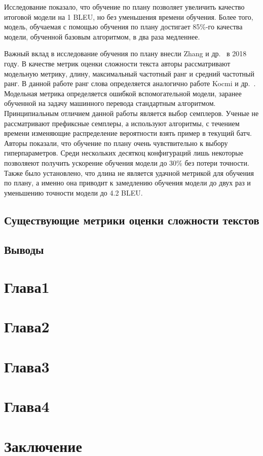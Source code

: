 \documentclass{spbau-diploma}
\begin{document}
Исследование показало, что обучение по плану позволяет увеличить качество итоговой модели на 1 BLEU, но без уменьшения времени обучения. Более того, модель, обучаемая с помощью обучения по плану достигает 85\%-го качества модели, обученной базовым алгоритмом, в два раза медленнее.

Важный вклад в исследование обучения по плану внесли Zhang и др.~\cite{zhang2018empirical} в 2018 году. В качестве метрик оценки сложности текста авторы рассматривают модельную метрику, длину, максимальный частотный ранг и средний частотный ранг. В данной работе ранг слова определяется аналогично работе Kocmi и др.~\cite{kocmi2017curriculum}. Модельная метрика определяется ошибкой вспомогательной модели, заранее обученной на задачу машинного перевода стандартным алгоритмом. Принципиальным отличием данной работы является выбор семплеров. Ученые не рассматривают префиксные семплеры, а используют алгоритмы, с течением времени изменяющие распределение вероятности взять пример в текущий батч. Авторы показали, что обучение по плану очень чувствительно к выбору гиперпараметров. Среди нескольких десяткоц конфигураций лишь некоторые позволяеют получить ускорение обучения модели до 30\% без потери точности. Также было установлено, что длина не является удачной метрикой для обучения по плану, а именно она приводит к замедлению обучения модели до двух раз и уменьшению точности модели до 4.2 BLEU.

\subsection{Существующие метрики оценки сложности текстов}
\subsection{Выводы}
\section{Глава1}
\section{Глава2}
\section{Глава3}
\section{Глава4}
\section{Заключение}
\end{document}
